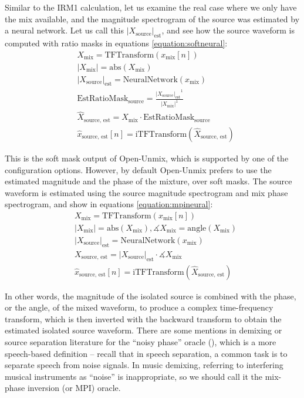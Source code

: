 \documentclass[report.tex]{subfiles}
\begin{document}
Similar to the IRM1 calculation, let us examine the real case where we only have the mix available, and the magnitude spectrogram of the source was estimated by a neural network. Let us call this $|X_{\text{source}}|_{\text{est}}$, and see how the source waveform is computed with ratio masks in equations \eqref{equation:softneural}:
\begin{align}\tag{2}\label{equation:softneural}
	\nonumber & X_{\text{mix}} = \text{TFTransform}(x_{\text{mix}}[n])\\
	\nonumber & |X_{\text{mix}}| = \text{abs}(X_{\text{mix}})\\
	\nonumber & {|X_{\text{source}}|}_{\text{est}} = \text{NeuralNetwork}(x_{\text{mix}})\\
	\nonumber & \text{EstRatioMask}_{\text{source}} = \frac{{|X_{\text{source}}|_{\text{est}}}^{1}}{|X_{\text{mix}}|^{1}}\\
	\nonumber & \hat{X}_{\text{source, est}} = X_{\text{mix}} \cdot \text{EstRatioMask}_{\text{source}}\\
	\nonumber & \hat{x}_{\text{source, est}}[n] = \text{iTFTransform}(\hat{X}_{\text{source, est}})
\end{align}

This is the soft mask output of Open-Unmix, which is supported by one of the configuration options. However, by default Open-Unmix prefers to use the estimated magnitude and the phase of the mixture, over soft masks. The source waveform is estimated using the source magnitude spectrogram and mix phase spectrogram, and show in equations \eqref{equation:mpineural}:
\begin{align}\tag{3}\label{equation:mpineural}
	\nonumber & X_{\text{mix}} = \text{TFTransform}(x_{\text{mix}}[n])\\
	\nonumber & |X_{\text{mix}}| = \text{abs}(X_{\text{mix}}), \measuredangle{X_{\text{mix}}} = \text{angle}(X_{\text{mix}})\\
	\nonumber & {|X_{\text{source}}|}_{\text{est}} = \text{NeuralNetwork}(x_{\text{mix}})\\
	\nonumber & X_{\text{source, est}} = {|X_{\text{source}}|}_{\text{est}} \cdot \measuredangle{X_{\text{mix}}}\\
	\nonumber & \hat{x}_{\text{source, est}}[n] = \text{iTFTransform}(\hat{X}_{\text{source, est}})
\end{align}

In other words, the magnitude of the isolated source is combined with the phase, or the angle, of the mixed waveform, to produce a complex time-frequency transform, which is then inverted with the backward transform to obtain the estimated isolated source waveform. There are some mentions in demixing or source separation literature for the ``noisy phase'' oracle (\cite{noisyphase1, noisyphase2}), which is a more speech-based definition -- recall that in speech separation, a common task is to separate speech from noise signals. In music demixing, referring to interfering musical instruments as ``noise'' is inappropriate, so we should call it the mix-phase inversion (or MPI) oracle.
\end{document}
